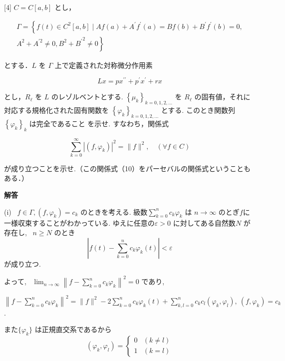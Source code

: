 \documentclass{jsarticle}
\begin{document}
\begin{itembox}[l]{[4]}
$C=C[a, b]$ とし，


\begin{gather*}
\Gamma=\left\{f(t) \in C^{2}[a, b] \mid A f(a)+A^{\prime} f^{\prime}(a)=B f(b)+B^{\prime} f^{\prime}(b)=0,\right. \\
\left.A^{2}+A^{\prime 2} \neq 0, B^{2}+{B^{\prime}}^{2} \neq 0\right\} \tag{8}
\end{gather*}


とする．$L$ を $\Gamma$ 上で定義された対称微分作用素


\begin{equation*}
L x=p x^{\prime \prime}+p^{\prime} x^{\prime}+r x \tag{9}
\end{equation*}


とし，$R_{\ell}$ を $L$ のレゾルベントとする. $\left\{\mu_{k}\right\}_{k=0,1,2, \ldots}$ を $R_{\ell}$ の固有値，それに対応する規格化された固有関数を $\left\{\varphi_{k}\right\}_{k=0,1,2, \ldots}$ とする. このとき関数列 $\left\{\varphi_{k}\right\}_{k}$ は完全であること を示せ. すなわち，関係式


\begin{equation*}
\sum_{k=0}^{\infty}\left|\left(f, \varphi_{k}\right)\right|^{2}=\|f\|^{2}, \quad(\forall f \in C) \tag{10}
\end{equation*}


が成り立つことを示せ.（この関係式（10）をパーセバルの関係式ということもある．）\\
  
\end{itembox}
\textbf{解答}

(i) \ $f \in \Gamma,\left(f, \varphi_{k}\right)=c_{k}$ のときを考える. 級数$\sum_{k=0}^{n} c_{k} \varphi_{k}$ は $n \rightarrow \infty$ のとぎ$f$に一様収束することがわかっている. ゆえに任意の$\varepsilon > 0$ に対してある自然数$N$ が存在し, \ $n \geq N$ のとき
$$
|f(t) - \displaystyle\sum_{k=0}^n c_k \varphi_k (t)| < \varepsilon
$$
が成り立つ. 

よって, \ $\displaystyle\lim_{n \to \infty} \left\| f - \sum_{k=0}^n c_k \varphi_k \right \|^2 = 0$ であり, \ 

$\displaystyle \left\| f - \sum_{k=0}^n c_k \varphi_k \right\|^2 = \|f\|^2 - 2\sum_{k=0}^n c_k \varphi_k (t) + \sum_{k,l = 0}^n c_k c_l (\varphi_k, \varphi_l), \ (f, \varphi_k) = c_k$.

また$\{\varphi_k\}$ は正規直交系であるから
$$
(\varphi_k, \varphi_l) = \begin{cases} 0 & (k \neq l)\\
1 & (k=l) 
\end{cases}
$$
\end{document}
